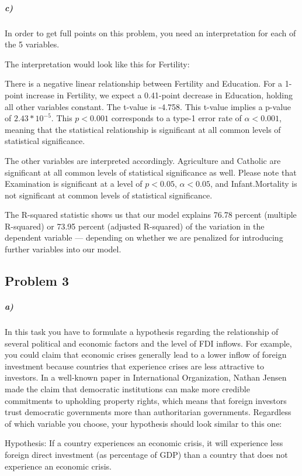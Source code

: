 \documentclass[12pt,letter]{article}\usepackage[]{graphicx}\usepackage[]{color}
\begin{document}
\subparagraph{c)} In order to get full points on this problem, you need an interpretation for each of the 5 variables.

The interpretation would look like this for Fertility:

There is a negative linear relationship between Fertility and Education. For a 1-point increase in Fertility, we expect a 0.41-point decrease in Education, holding all other variables constant. The t-value is -4.758. This t-value implies a p-value of $2.43*10^{-5}$. This $p < 0.001$ corresponds to a type-1 error rate of $\alpha < 0.001$, meaning that the statistical relationship is significant at all common levels of statistical significance.

The other variables are interpreted accordingly. Agriculture and Catholic are significant at all common levels of statistical significance as well. Please note that Examination is significant at a level of $p < 0.05$, $\alpha < 0.05$, and Infant.Mortality is not significant at common levels of statistical significance.

The R-squared statistic shows us that our model explains 76.78 percent (multiple R-squared) or 73.95 percent (adjusted R-squared) of the variation in the dependent variable --- depending on whether we are penalized for introducing further variables into our model.



\subsection*{Problem 3}

\subparagraph{a)} In this task you have to formulate a hypothesis regarding the relationship of several political and economic factors and the level of FDI inflows. For example, you could claim that economic crises generally lead to a lower inflow of foreign investment because countries that experience crises are less attractive to investors. In a well-known paper in International Organization, Nathan Jensen made the claim that democratic institutions can make more credible commitments to upholding property rights, which means that foreign investors trust democratic governments more than authoritarian governments. Regardless of which variable you choose, your hypothesis should look similar to this one:

Hypothesis: If a country experiences an economic crisis, it will experience less foreign direct investment (as percentage of GDP) than a country that does not experience an economic crisis.
\end{document}
